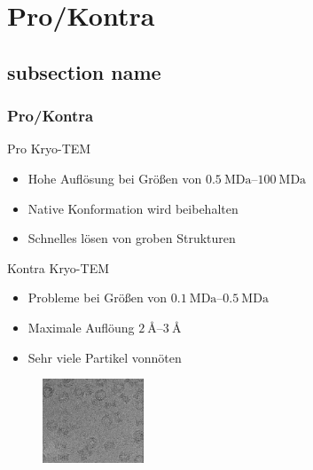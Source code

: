 \section{Pro/Kontra} %
\label{sec:pro_kontra}
\subsection*{subsection name} %
\label{sub:subsection_name}

\begin{frame}
	\frametitle{Pro/Kontra}
	\begin{block}{Pro Kryo-TEM}
		\begin{itemize}
			\item Hohe Auflösung bei Größen von $\SIrange[range-phrase = -]{0.5}{100}{\mega\dalton}$			
			\item Native Konformation wird beibehalten
			\item Schnelles lösen von groben Strukturen
		\end{itemize}
	\end{block}
	\begin{block}{Kontra Kryo-TEM}
		\begin{itemize}
			\item Probleme bei Größen von $\SIrange[range-phrase = -]{0.1}{0.5}{\mega\dalton}$
			\item Maximale Auflöung $\SIrange[range-phrase = -]{2}{3}{\angstrom}$
			\item Sehr viele Partikel vonnöten
		\end{itemize}
	\end{block}
	\begin{figure}
		\includegraphics[height = 2.5cm]{pic/kryo1.png}
	\end{figure}
\end{frame}

